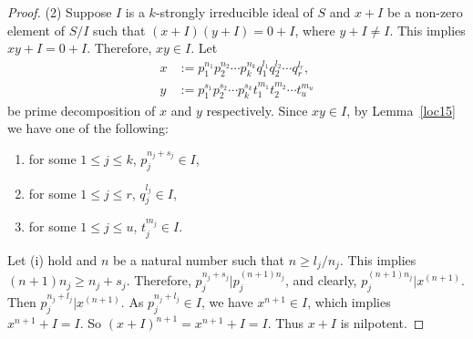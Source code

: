 \documentclass[11pt,english]{amsart}
\theoremstyle{definition}
\numberwithin{equation}{section}
\begin{document}
\begin{proof}

   
     (2) Suppose $I$ is a $k$-strongly irreducible ideal of $S$ and $x+I$ be a non-zero element of $S/I$ such that $(x+I)(y+I)=0+I$, where $y+I \neq I$. This implies $xy+I=0+I$. Therefore, $xy\in I$. Let
     \begin{align*}
     	x&:=p_1^{n_1}p_2^{n_2}\cdots p_k^{n_k}q_1^{l_1}q_2^{l_2}\cdots q_r^{l_r},\\
     	y&:=p_1^{s_1}p_2^{s_2}\cdots p_k^{s_k}t_1^{m_1}t_2^{m_2}\cdots t_u^{m_u}
     \end{align*}  be prime decomposition of $x$ and $y$ respectively. Since $xy \in I$, by Lemma~\ref{loc15} we have one of the following:
    \begin{enumerate}
        \item [(i)] for some $1\leqslant j \leqslant k$, $p_j^{n_j+s_j}\in I$,
        \item[(ii)] for some $1\leqslant j \leqslant r$, $q_j^{l_j}\in I$,
        \item[(iii)] for some $1\leqslant j \leqslant u$, $t_j^{m_j}\in I$. 
    \end{enumerate}
    Let (i) hold and $n$ be a natural number such that $n\geqslant l_j/n_j $. This implies $(n+1)n_j \geqslant n_j+s_j$. Therefore, $p_j^{n_j+s_j} | p_j^{(n+1)n_j}$, and clearly, $p_j^{(n+1)n_j} | x^{(n+1)}$. Then $p_j^{n_j+l_j}| x^{(n+1)}$. As $p_j^{n_j+l_j} \in I$, we have $x^{n+1} \in I$, which implies $x^{n+1}+I=I$. So $(x+I)^{n+1}=x^{n+1}+I=I$. Thus $x+I$ is nilpotent. 


\end{proof}
\end{document}
